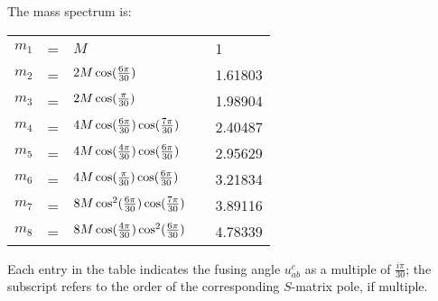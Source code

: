 \documentclass[a4paper,12pt]{report}
\begin{document}
The mass spectrum is:

\begin{center}
\begin{tabular}{|cclc|l|} \hline
$m_1$ &=& $M$ & & 1   \\
$m_2$ &=& $2 M \cos({6\pi \over 30})$ & & 1.61803  \\
$m_3$ &=& $2 M \cos({\pi \over 30})$ & & 1.98904  \\
$m_4$ &=& $4 M \cos({6\pi \over 30})\cos({7\pi \over 30})$ & & 2.40487  \\
$m_5$ &=& $4 M \cos({4\pi \over 30}) \cos({6\pi \over 30})$ & & 2.95629 \\
$m_6$ &=& $4 M \cos({\pi\over 30})\cos({6\pi \over 30}) $ & & 3.21834 \\
$m_7$ &=& $8 M \cos^{2}({6\pi \over 30}) \cos({7\pi \over 30})$ & & 3.89116 \\
$m_8$ &=& $8 M \cos({4\pi\over 30}) \cos^{2}({6\pi \over 30})$ & & 4.78339 \\ \hline
\end{tabular}
\end{center}

\vspace{0.5cm}

Each entry in the table indicates the fusing angle $u_{ab}^{c}$ as a multiple of $\frac{i\pi}{30}$; the subscript
refers to the order of the corresponding $S$-matrix pole, if multiple.
\end{document}
